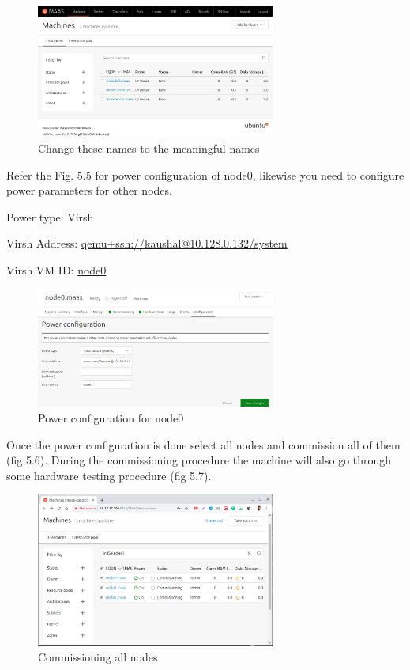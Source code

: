 \begin{figure}[!ht]
    \centering
    \includegraphics[width=0.7\textwidth]{images/5-4.png}
    \caption{Change these names to the meaningful names}
\end{figure}

Refer the Fig. 5.5 for power configuration of node0, likewise you need to configure power parameters for other nodes.

Power type: Virsh

Virsh Address: \url{qemu+ssh://kaushal@10.128.0.132/system}

Virsh VM ID: \url{node0}

\begin{figure}[!ht]
    \centering
    \includegraphics[width=0.7\textwidth]{images/5-5.png}
    \caption{Power configuration for node0}
\end{figure}

Once the power configuration is done select all nodes and commission all of them (fig 5.6). During the commissioning procedure the machine will also go through some hardware testing procedure (fig 5.7).

\begin{figure}[!ht]
    \centering
    \includegraphics[width=0.7\textwidth]{images/5-6.png}
    \caption{Commissioning all nodes}
\end{figure}

